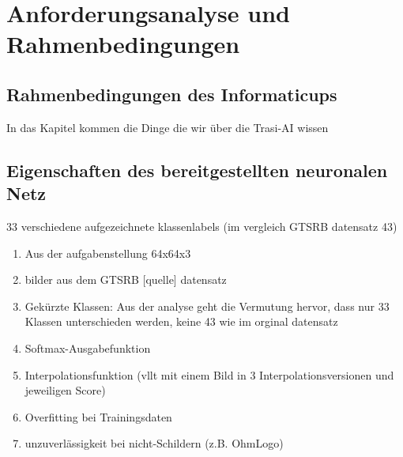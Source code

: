 \chapter{Anforderungsanalyse und Rahmenbedingungen}
\label{cha:AnfAnalyse}


\section{Rahmenbedingungen des Informaticups}
In das Kapitel kommen die Dinge die wir über die Trasi-AI wissen
\section{Eigenschaften des bereitgestellten neuronalen Netz}
\label{sec:EigenschaftenTrasi}




33 verschiedene aufgezeichnete klassenlabels (im vergleich GTSRB datensatz 43)

\begin{enumerate}
	\item 
	Aus der aufgabenstellung 64x64x3
	\item 
	bilder aus dem GTSRB [quelle] datensatz
	\item Gekürzte Klassen: Aus der analyse geht die Vermutung hervor, dass nur 33 Klassen unterschieden werden, keine 43 wie im orginal datensatz
	\item Softmax-Ausgabefunktion 
	\item Interpolationsfunktion (vllt mit einem Bild in 3 Interpolationsversionen und jeweiligen Score) 
	\item Overfitting bei Trainingsdaten
	\item unzuverlässigkeit bei nicht-Schildern (z.B. OhmLogo)
\end{enumerate}


